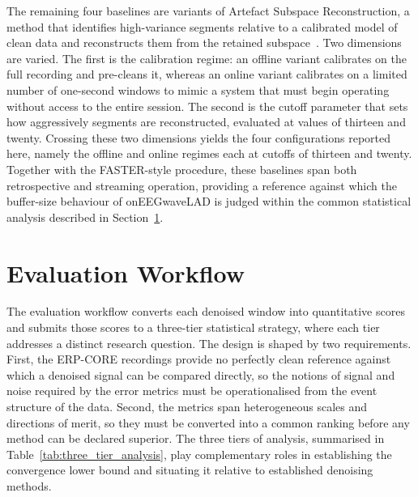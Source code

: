 \documentclass[MScCS,12pt,oneside,final]{uccthesis}
\begin{document}
The remaining four baselines are variants of Artefact Subspace Reconstruction, a method that identifies high-variance segments relative to a calibrated model of clean data and reconstructs them from the retained subspace~\parencite{mullen2015real}. Two dimensions are varied. The first is the calibration regime: an offline variant calibrates on the full recording and pre-cleans it, whereas an online variant calibrates on a limited number of one-second windows to mimic a system that must begin operating without access to the entire session. The second is the cutoff parameter that sets how aggressively segments are reconstructed, evaluated at values of thirteen and twenty. Crossing these two dimensions yields the four configurations reported here, namely the offline and online regimes each at cutoffs of thirteen and twenty. Together with the FASTER-style procedure, these baselines span both retrospective and streaming operation, providing a reference against which the buffer-size behaviour of onEEGwaveLAD is judged within the common statistical analysis described in Section~\ref{sec:evaluation_workflow}.

\section{Evaluation Workflow}
\label{sec:evaluation_workflow}

The evaluation workflow converts each denoised window into quantitative scores and submits those scores to a three-tier statistical strategy, where each tier addresses a distinct research question. The design is shaped by two requirements. First, the ERP-CORE recordings provide no perfectly clean reference against which a denoised signal can be compared directly, so the notions of signal and noise required by the error metrics must be operationalised from the event structure of the data. Second, the metrics span heterogeneous scales and directions of merit, so they must be converted into a common ranking before any method can be declared superior. The three tiers of analysis, summarised in Table~\ref{tab:three_tier_analysis}, play complementary roles in establishing the convergence lower bound and situating it relative to established denoising methods.
\end{document}
